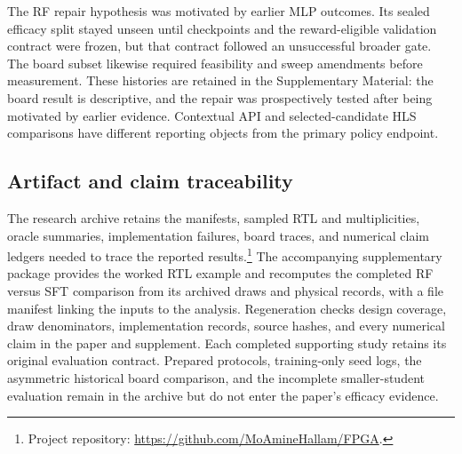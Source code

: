 The RF repair hypothesis was motivated by earlier MLP outcomes. Its sealed
efficacy split stayed unseen until checkpoints and the reward-eligible validation
contract were frozen, but that contract followed an unsuccessful broader gate.
The board subset likewise required feasibility and sweep amendments before
measurement. These histories are retained in the Supplementary Material:
the board result is descriptive, and the repair was prospectively tested after
being motivated by earlier evidence. Contextual API and selected-candidate HLS
comparisons have different reporting objects from the primary policy endpoint.

\subsection{Artifact and claim traceability}

The research archive retains the manifests, sampled RTL and multiplicities, oracle
summaries, implementation failures, board traces, and numerical claim
ledgers needed to trace the reported results.\footnote{
Project repository: \url{https://github.com/MoAmineHallam/FPGA}.}
The accompanying supplementary package provides the worked RTL example and
recomputes the completed RF versus SFT comparison from its archived draws and
physical records, with a file manifest linking the inputs to the analysis.
Regeneration checks design coverage, draw denominators, implementation records,
source hashes, and every numerical claim in the paper and supplement. Each
completed supporting study retains its original evaluation contract. Prepared
protocols, training-only seed logs, the asymmetric historical board comparison,
and the incomplete smaller-student evaluation remain in the archive but do
not enter the paper's efficacy evidence.
